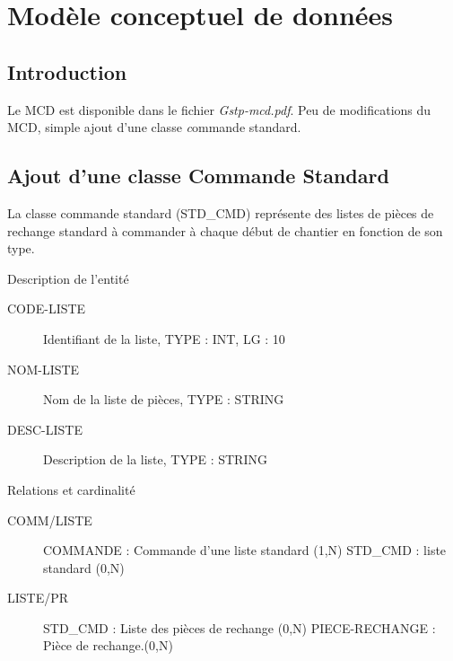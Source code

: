 \section{Modèle conceptuel de données}

\subsection{Introduction}
Le MCD est disponible dans le fichier {\sl Gstp-mcd.pdf}.
Peu de modifications du MCD, simple ajout d'une classe {\emph commande standard}.


\subsection{Ajout d'une classe Commande Standard}

La classe commande standard (STD\_CMD) représente des listes de pièces de 
rechange standard à commander à chaque début de chantier en fonction de son type.

\par{Description de l'entité}
\begin{description}
    \item[CODE-LISTE] Identifiant de la liste, TYPE : INT, LG : 10
    \item[NOM-LISTE] Nom de la liste de pièces, TYPE : STRING
    \item[DESC-LISTE] Description de la liste, TYPE : STRING
\end{description}

\par{Relations et cardinalité}
\begin{description}
    \item[COMM/LISTE] COMMANDE : Commande d'une liste standard (1,N)\el
        STD\_CMD : liste standard (0,N)
    \item[LISTE/PR] STD\_CMD : Liste des pièces de rechange (0,N)\el
        PIECE-RECHANGE :  Pièce de rechange.(0,N)
\end{description}


